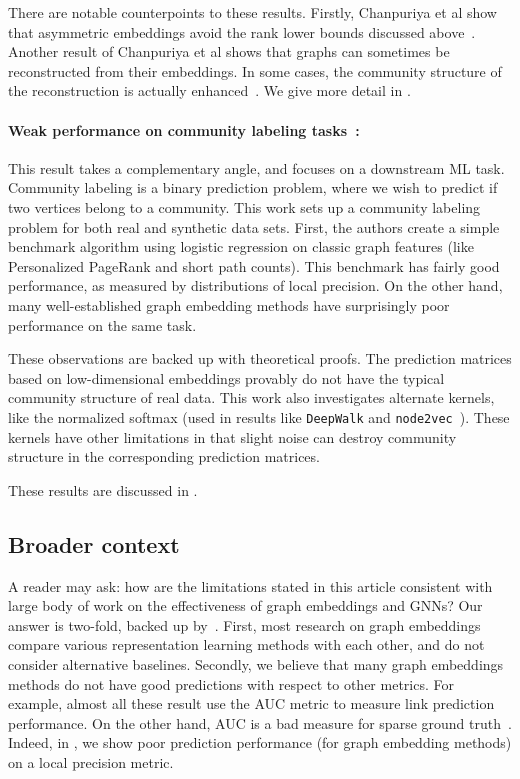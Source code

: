 \documentclass[11pt]{article}
\begin{document}
There are notable counterpoints to these results.
Firstly, Chanpuriya et al show that asymmetric embeddings avoid the rank lower bounds
discussed above~\cite{CMST20}. Another result of Chanpuriya et al shows that graphs can sometimes be
reconstructed from their embeddings. In some cases, the community structure of the reconstruction
is actually enhanced~\cite{ChMu+21}. We give more detail in .

\paragraph{Weak performance on community labeling tasks~\cite{StLe+22}:} This result takes
a complementary angle, and focuses on a downstream ML task. Community labeling is a binary
prediction problem, where we wish to predict if two vertices belong to a community.
This work sets up a community labeling problem for both real and synthetic data sets. First,
the authors create a simple benchmark algorithm using logistic regression on classic graph 
features (like Personalized PageRank and short path counts). This benchmark has fairly
good performance, as measured by distributions of local precision. On the other hand,
many well-established graph embedding methods have surprisingly poor performance
on the same task.

These observations are backed up with theoretical proofs. The prediction matrices
based on low-dimensional embeddings provably do not have the typical community
structure of real data. This work also investigates alternate kernels,
like the normalized softmax (used in results like {\tt DeepWalk} and {\tt node2vec}~\cite{PeAlSk14,GrLe16}).
These kernels have other limitations in that slight noise can destroy community
structure in the corresponding prediction matrices.

These results are discussed in .

\subsection{Broader context} \label{sec:context}

A reader may ask: how are the limitations stated in this article consistent
with large body of work on the effectiveness of graph embeddings and GNNs?
Our answer is two-fold, backed up by~\cite{GuVi+19,HuHe+21}. First, most research on graph embeddings compare various representation
learning methods with each other, and do not consider alternative baselines. Secondly, we believe that many graph embeddings methods do not 
have good predictions with respect to other metrics. For example, almost all
these result use the AUC metric to measure link prediction performance. On the other hand,
AUC is a bad measure for sparse ground truth~\cite{Ha09,LiCh12}. Indeed, in ,
we show poor prediction performance (for graph embedding methods) on a local precision metric.
\end{document}
